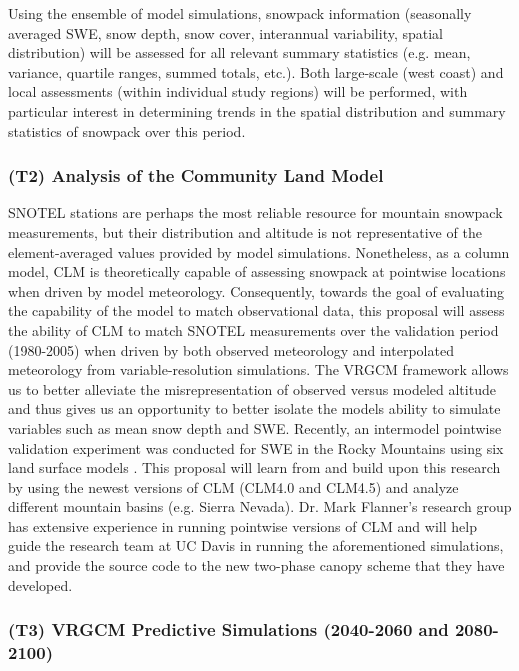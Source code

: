 \documentclass[11pt]{article}
\begin{document}
Using the ensemble of model simulations, snowpack information (seasonally averaged SWE, snow depth, snow cover, interannual variability, spatial distribution) will be assessed for all relevant summary statistics (e.g. mean, variance, quartile ranges, summed totals, etc.). Both large-scale (west coast) and local assessments (within individual study regions) will be performed, with particular interest in determining trends in the spatial distribution and summary statistics of snowpack over this period.


\subsubsection{(T2) Analysis of the Community Land Model}

SNOTEL stations are perhaps the most reliable resource for mountain snowpack measurements, but their distribution and altitude is not representative of the element-averaged values provided by model simulations.  Nonetheless, as a column model, CLM is theoretically capable of assessing snowpack at pointwise locations when driven by model meteorology.  Consequently, towards the goal of evaluating the capability of the model to match observational data, this proposal will assess the ability of CLM to match SNOTEL measurements over the validation period (1980-2005) when driven by both observed meteorology and interpolated meteorology from variable-resolution simulations.  The VRGCM framework allows us to better alleviate the misrepresentation of observed versus modeled altitude and thus gives us an opportunity to better isolate the models ability to simulate variables such as mean snow depth and SWE.  Recently, an intermodel pointwise validation experiment was conducted for SWE in the Rocky Mountains using six land surface models \citep{chen2014modeling}.  This proposal will learn from and build upon this research by using the newest versions of CLM (CLM4.0 and CLM4.5) and analyze different mountain basins (e.g. Sierra Nevada).  Dr. Mark Flanner's research group has extensive experience in running pointwise versions of CLM and will help guide the research team at UC Davis in running the aforementioned simulations, and provide the source code to the new two-phase canopy scheme that they have developed.  

\subsubsection{(T3) VRGCM Predictive Simulations (2040-2060 and 2080-2100)}
\end{document}
